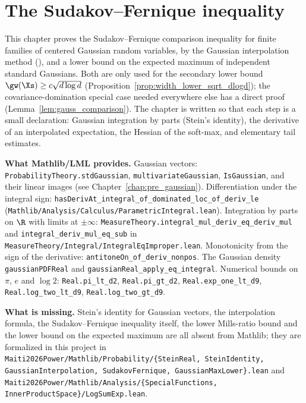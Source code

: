 \chapter{The Sudakov--Fernique inequality}
\label{chap:pre_sudakov}

This chapter proves the Sudakov--Fernique comparison inequality for finite families of
centered Gaussian random variables, by the Gaussian interpolation method
(\cite[Theorem~7.2.11]{vershynin2018high}), and a lower bound on the expected maximum of
independent standard Gaussians. Both are only used for the secondary lower bound
$\gw(\Xs) \ge c\sqrt{d\log d}$ (Proposition~\ref{prop:width_lower_sqrt_dlogd}); the
covariance-domination special case needed everywhere else has a direct proof
(Lemma~\ref{lem:gauss_comparison}). The chapter is written so that each step is a small
declaration: Gaussian integration by parts (Stein's identity), the derivative of an
interpolated expectation, the Hessian of the soft-max, and elementary tail estimates.

\textbf{What Mathlib/LML provides.} Gaussian vectors: \texttt{ProbabilityTheory.stdGaussian},
\texttt{multivariateGaussian}, \texttt{IsGaussian}, and their linear images (see
Chapter~\ref{chap:pre_gaussian}). Differentiation under the integral sign:
\texttt{hasDerivAt\_integral\_of\_dominated\_loc\_of\_deriv\_le}
(\texttt{Mathlib/Analysis/Calculus/ParametricIntegral.lean}). Integration by parts on $\R$ with
limits at $\pm\infty$: \texttt{MeasureTheory.integral\_mul\_deriv\_eq\_deriv\_mul} and
\texttt{integral\_deriv\_mul\_eq\_sub} in \texttt{MeasureTheory/Integral/IntegralEqImproper.lean}.
Monotonicity from the sign of the derivative: \texttt{antitoneOn\_of\_deriv\_nonpos}. The
Gaussian density \texttt{gaussianPDFReal} and \texttt{gaussianReal\_apply\_eq\_integral}.
Numerical bounds on $\pi$, $e$ and $\log 2$: \texttt{Real.pi\_lt\_d2}, \texttt{Real.pi\_gt\_d2},
\texttt{Real.exp\_one\_lt\_d9}, \texttt{Real.log\_two\_lt\_d9}, \texttt{Real.log\_two\_gt\_d9}.

\textbf{What is missing.} Stein's identity for Gaussian vectors, the interpolation formula, the
Sudakov--Fernique inequality itself, the lower Mills-ratio bound and the lower bound on the
expected maximum are all absent from Mathlib; they are formalized in this project in
\texttt{Maiti2026Power/Mathlib/Probability/\{SteinReal, SteinIdentity, GaussianInterpolation,
SudakovFernique, GaussianMaxLower\}.lean} and
\texttt{Maiti2026Power/Mathlib/Analysis/\{SpecialFunctions, InnerProductSpace\}/LogSumExp.lean}.

